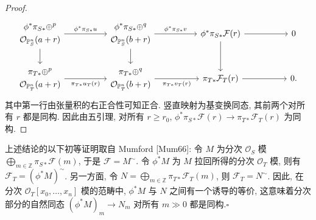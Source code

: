 \begin{proof}
\[
\begin{tikzcd}[column sep=5em]
\begin{gathered}\phi^*\pi_{S*}\oplus^p\\\mathcal O_{\mathbb P^n_S}(a+r)\end{gathered}\arrow[r,"\phi^*\pi_{S*}u"]\arrow[d]
 &\begin{gathered}\phi^*\pi_{S*}\oplus^q\\\mathcal O_{\mathbb P^n_S}(b+r)\end{gathered}\arrow[r,"\phi^*\pi_{S*}v"]\arrow[d]
 &\phi^*\pi_{S*}\mathcal F(r)\arrow[r]\arrow[d]&0\\
\begin{gathered}\pi_{T*}\oplus^p\\\mathcal O_{\mathbb P^n_T}(a+r)\end{gathered}\arrow[r,"\pi_{T*}u_T(r)"']
 &\begin{gathered}\pi_{T*}\oplus^q\\\mathcal O_{\mathbb P^n_T}(b+r)\end{gathered}\arrow[r,"\pi_{T*}v_T(r)"']
 &\pi_{T*}\mathcal F_T(r)\arrow[r]&0.
\end{tikzcd}
\]
其中第一行由张量积的右正合性可知正合. 竖直映射为基变换同态, 其前两个对所有 $r$ 都是同构. 因此由五引理, 对所有 $r\geq r_0$, $\phi^*\pi_{S*}\mathcal F(r)\to\pi_{T*}\mathcal F_T(r)$ 为同构.
\end{proof}

上述结论的以下初等证明取自 Mumford [Mum66]: 令 $M$ 为分次 $\mathcal O_S$ 模 $\bigoplus_{m\in\mathbb Z}\pi_{S*}\mathcal F(m)$, 于是 $\mathcal F=M^\sim$. 令 $\phi^*M$ 为 $M$ 拉回所得的分次 $\mathcal O_T$ 模, 则有 $\mathcal F_T=(\phi^*M)^\sim$. 另一方面, 令 $N=\bigoplus_{m\in\mathbb Z}\pi_{T*}\mathcal F_T(m)$, 则 $\mathcal F_T=N^\sim$. 因此, 在分次 $\mathcal O_T[x_0,\ldots,x_n]$ 模的范畴中, $\phi^*M$ 与 $N$ 之间有一个诱导的等价, 这意味着分次部分的自然同态 $(\phi^*M)_m\to N_m$ 对所有 $m\gg0$ 都是同构.\hfill$\square$

